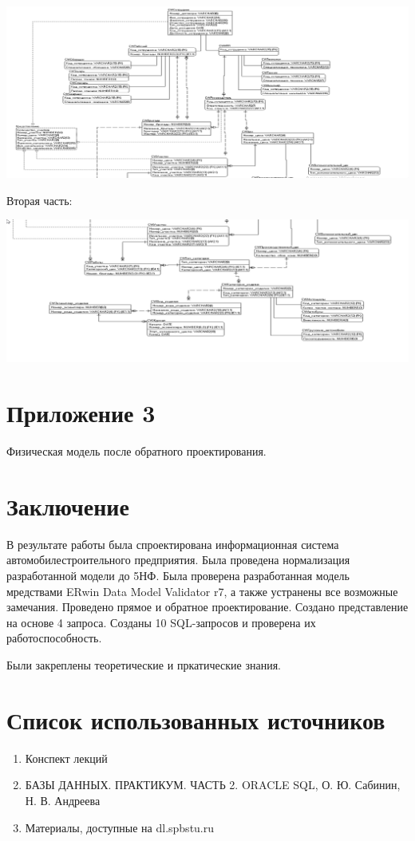     \includegraphics[width=14cm]{./screenshots/model/physical_top.png}

    Вторая часть:

    \includegraphics[width=14cm]{./screenshots/model/physical_bottom.png}

\section{Приложение 3}

    Физическая модель после обратного проектирования.



\section{Заключение}
В результате работы была спроектирована информационная система автомобилестроительного предприятия.
Была проведена нормализация разработанной модели до 5НФ.
Была проверена разработанная модель мредствами ERwin Data Model Validator r7, а также устранены все возможные замечания.
Проведено прямое и обратное проектирование.
Создано представление на основе 4 запроса.
Созданы 10 SQL-запросов и проверена их работоспособность.

Были закреплены теоретические и пркатические знания.

\section{Список использованных источников}

\begin{enumerate}

    \item Конспект лекций
    \item БАЗЫ ДАННЫХ. ПРАКТИКУМ. ЧАСТЬ 2. ORACLE SQL, О. Ю. Сабинин, Н. В. Андреева
    \item Материалы, доступные на dl.spbstu.ru

\end{enumerate}

